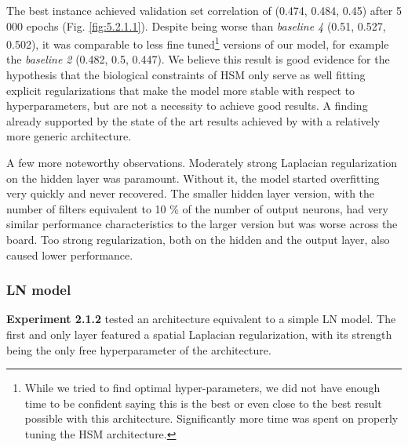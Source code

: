 The best instance achieved validation set correlation of (0.474, 0.484, 0.45) after 5 000 epochs (Fig. \ref{fig:5.2.1.1}). Despite being worse than \textit{baseline 4} (0.51, 0.527, 0.502), it was comparable to less fine tuned\footnote{While we tried to find optimal hyper-parameters, we did not have enough time to be confident saying this is the best or even close to the best result possible with this architecture. Significantly more time was spent on properly tuning the HSM architecture.} versions of our model, for example the \textit{baseline 2} (0.482, 0.5, 0.447). We believe this result is good evidence for the hypothesis that the biological constraints of {HSM} only serve as well fitting explicit regularizations that make the model more stable with respect to hyperparameters, but are not a necessity to achieve good results. A finding already supported by the state of the art results achieved by \cite{klindt} with a relatively more generic architecture.

A few more noteworthy observations. Moderately strong Laplacian regularization on the hidden layer was paramount. Without it, the model started overfitting very quickly and never recovered. The smaller hidden layer version, with the number of filters equivalent to 10 \% of the number of output neurons, had very similar performance characteristics to the larger version but was worse across the board. Too strong regularization, both on the hidden and the output layer, also caused lower performance.

\subsubsection{LN model}

\textbf{Experiment 2.1.2} tested an architecture equivalent to a simple LN model. The first and only layer featured a spatial Laplacian regularization, with its strength being the only free hyperparameter of the architecture. 

